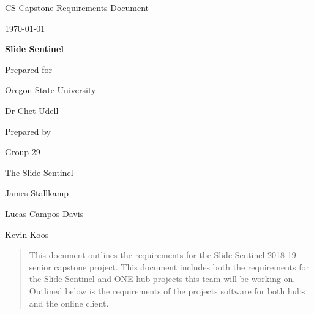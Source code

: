 \documentclass[onecolumn, draftclsnofoot,10pt, compsoc]{IEEEtran}
\def \CapstoneTeamName{		        The Slide Sentinel}
\def \CapstoneTeamNumber{		    29}
\def \GroupMemberOne{			    James Stallkamp}
\def \GroupMemberTwo{			    Lucas Campos-Davis}
\def \GroupMemberThree{			    Kevin Koos}
\def \CapstoneProjectName{		    Slide Sentinel}
\def \CapstoneSponsorCompany{	    Oregon State University}
\def \CapstoneSponsorPerson{		Dr Chet Udell}
\def \DocType{	%
				Requirements Document
				}
\newcommand{\NameSigPair}[1]{\par
\makebox[2.75in][r]{#1} \hfil 	\makebox[3.25in]{\makebox[2.25in]{\hrulefill} \hfill		\makebox[.75in]{\hrulefill}}
\par\vspace{-12pt} \textit{\tiny\noindent
\makebox[2.75in]{} \hfil		\makebox[3.25in]{\makebox[2.25in][r]{Signature} \hfill	\makebox[.75in][r]{Date}}}}
\renewcommand{\NameSigPair}[1]{#1}
\begin{document}
\nocite{*}

\begin{titlepage}
    \begin{singlespace}
        \hfill 
        \par\vspace{.2in}
        \centering
        \scshape{
            \huge CS Capstone \DocType \par
            {\large\today}\par
            \vspace{.5in}
            \textbf{\Huge\CapstoneProjectName}\par
            \vfill
            {\large Prepared for}\par
            \Huge \CapstoneSponsorCompany\par
            \vspace{5pt}
            {\Large\NameSigPair{\CapstoneSponsorPerson}\par}
            {\large Prepared by }\par
            Group\CapstoneTeamNumber\par
            \CapstoneTeamName\par 
            \vspace{5pt}
            {\Large
                \NameSigPair{\GroupMemberOne}\par
                \NameSigPair{\GroupMemberTwo}\par
                \NameSigPair{\GroupMemberThree}\par
            }
            \vspace{20pt}
        }
        \begin{abstract}
        	This document outlines the requirements for the Slide Sentinel 2018-19 senior capstone project. This document includes both the requirements for the Slide Sentinel and ONE hub projects this team will be working on. Outlined below is the requirements of the projects software for both hubs and the online client.
        \end{abstract}     
    \end{singlespace}
\end{titlepage}
\end{document}
